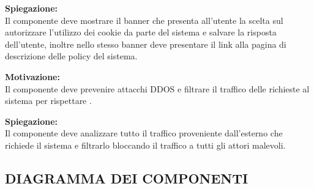\begin{listaPersonale}[ACI]{}
    \textbf{Spiegazione:}\\
    Il componente deve mostrare il banner che presenta all'utente la scelta sul autorizzare l'utilizzo dei cookie da parte del sistema e salvare la risposta dell'utente, inoltre nello stesso banner deve presentare il link alla pagina di descrizione delle policy del sistema.


    \textbf{Motivazione:}\\
    Il componente deve prevenire attacchi DDOS e filtrare il traffico delle richieste al sistema per rispettare .

    \textbf{Spiegazione:}\\
    Il componente deve analizzare tutto il traffico proveniente dall'esterno che richiede il sistema e filtrarlo bloccando il traffico a tutti gli attori malevoli.
\end{listaPersonale}






































\subsection{DIAGRAMMA DEI COMPONENTI}


